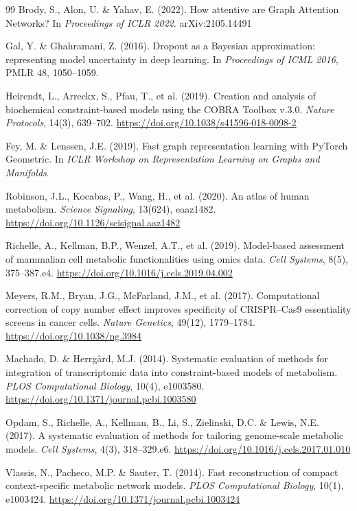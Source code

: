 \documentclass[12pt,a4paper]{article}
\begin{document}
\begin{thebibliography}{99}
 Brody, S., Alon, U. \& Yahav, E. (2022). How attentive are Graph Attention Networks? In \textit{Proceedings of ICLR 2022}. arXiv:2105.14491

 Gal, Y. \& Ghahramani, Z. (2016). Dropout as a Bayesian approximation: representing model uncertainty in deep learning. In \textit{Proceedings of ICML 2016}, PMLR 48, 1050--1059.

 Heirendt, L., Arreckx, S., Pfau, T., et al. (2019). Creation and analysis of biochemical constraint-based models using the COBRA Toolbox v.3.0. \textit{Nature Protocols}, 14(3), 639--702. \url{https://doi.org/10.1038/s41596-018-0098-2}

 Fey, M. \& Lenssen, J.E. (2019). Fast graph representation learning with PyTorch Geometric. In \textit{ICLR Workshop on Representation Learning on Graphs and Manifolds}.

 Robinson, J.L., Kocabas, P., Wang, H., et al. (2020). An atlas of human metabolism. \textit{Science Signaling}, 13(624), eaaz1482. \url{https://doi.org/10.1126/scisignal.aaz1482}

 Richelle, A., Kellman, B.P., Wenzel, A.T., et al. (2019). Model-based assessment of mammalian cell metabolic functionalities using omics data. \textit{Cell Systems}, 8(5), 375--387.e4. \url{https://doi.org/10.1016/j.cels.2019.04.002}

 Meyers, R.M., Bryan, J.G., McFarland, J.M., et al. (2017). Computational correction of copy number effect improves specificity of CRISPR--Cas9 essentiality screens in cancer cells. \textit{Nature Genetics}, 49(12), 1779--1784. \url{https://doi.org/10.1038/ng.3984}

 Machado, D. \& Herrg\r{a}rd, M.J. (2014). Systematic evaluation of methods for integration of transcriptomic data into constraint-based models of metabolism. \textit{PLOS Computational Biology}, 10(4), e1003580. \url{https://doi.org/10.1371/journal.pcbi.1003580}

 Opdam, S., Richelle, A., Kellman, B., Li, S., Zielinski, D.C. \& Lewis, N.E. (2017). A systematic evaluation of methods for tailoring genome-scale metabolic models. \textit{Cell Systems}, 4(3), 318--329.e6. \url{https://doi.org/10.1016/j.cels.2017.01.010}

 Vlassis, N., Pacheco, M.P. \& Sauter, T. (2014). Fast reconstruction of compact context-specific metabolic network models. \textit{PLOS Computational Biology}, 10(1), e1003424. \url{https://doi.org/10.1371/journal.pcbi.1003424}


\end{thebibliography}
\end{document}
